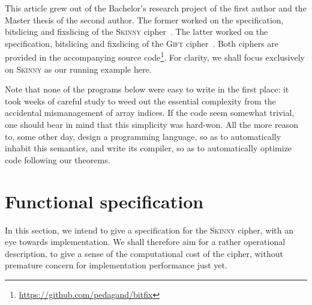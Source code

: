 \documentclass[draft,english]{jflart}
\newcommand{\Skinny}{\textsc{Skinny}}
\newcommand{\Gift}{\textsc{Gift}}
\begin{document}


This article grew out of the Bachelor's research project of the first
author and the Master thesis of the second author. The former worked
on the specification, bitslicing and fixslicing of the \Skinny{}
cipher~\citep{beierle:skinny, adomnicai:fixslicing-AES-like}. The
latter worked on the specification, bitslicing and fixslicing of the
\Gift{} cipher~\citep{subhadeep:gift, adominicai:fixslicing-gift}. Both
ciphers are provided in the accompanying source
code\footnote{\url{https://github.com/pedagand/bitfix}}. For clarity,
we shall focus exclusively on \Skinny{} as our running example here.

Note that none of the programs below were easy to write in the first
place: it took weeks of careful study to weed out the essential
complexity from the accidental mismanagement of array indices. If the
code seem somewhat trivial, one should bear in mind that this
simplicity was hard-won. All the more reason to, some other day,
design a programming language, so as to automatically inhabit this
semantics, and write its compiler, so as to automatically optimize
code following our theorems.

\section{Functional specification}
\label{sec:spec}


In this section, we intend to give a specification for the \Skinny{}
cipher, with an eye towards implementation. We shall therefore aim for
a rather operational description, to give a sense of the computational
cost of the cipher, without premature concern for implementation
performance just yet.

\end{document}
